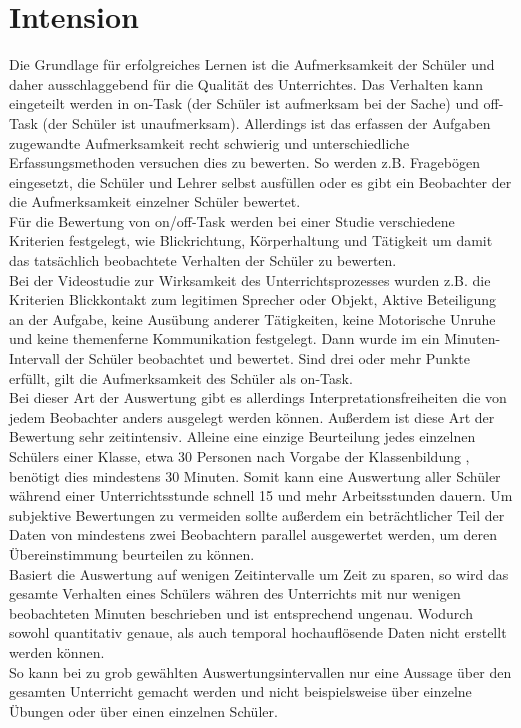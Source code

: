 \section{Intension}
\label{intension}
Die Grundlage für erfolgreiches Lernen ist die Aufmerksamkeit der Schüler und  daher ausschlaggebend für die Qualität des Unterrichtes. Das Verhalten kann eingeteilt werden in on-Task (der Schüler ist aufmerksam bei der Sache) und off-Task (der Schüler ist unaufmerksam). Allerdings ist das erfassen der Aufgaben zugewandte Aufmerksamkeit recht schwierig und unterschiedliche Erfassungsmethoden versuchen dies zu bewerten. So werden z.B. Fragebögen eingesetzt, die Schüler und Lehrer selbst ausfüllen oder es gibt ein Beobachter der die Aufmerksamkeit einzelner Schüler bewertet.\\
Für die Bewertung von on/off-Task werden bei einer Studie verschiedene Kriterien festgelegt, wie Blickrichtung, Körperhaltung und Tätigkeit um damit das tatsächlich beobachtete Verhalten der Schüler zu bewerten.\\
Bei der \glqq Videostudie zur Wirksamkeit des Unterrichtsprozesses \grqq \cite{aufmerksamkeit_Studie} wurden z.B. die Kriterien Blickkontakt zum legitimen Sprecher oder Objekt, Aktive Beteiligung an der Aufgabe, keine Ausübung anderer Tätigkeiten, keine Motorische Unruhe und keine themenferne Kommunikation festgelegt. Dann wurde im ein Minuten-Intervall der Schüler beobachtet und bewertet. Sind drei oder mehr Punkte erfüllt, gilt die Aufmerksamkeit des Schüler als on-Task.\\
Bei dieser Art der Auswertung gibt es allerdings Interpretationsfreiheiten die von jedem Beobachter anders ausgelegt werden können. Außerdem ist diese Art der Bewertung sehr zeitintensiv. Alleine eine einzige Beurteilung jedes einzelnen Schülers einer Klasse, etwa 30 Personen nach Vorgabe der Klassenbildung \cite{klassenteiler}, benötigt dies mindestens 30 Minuten. Somit kann eine Auswertung aller Schüler während einer Unterrichtsstunde schnell 15 und mehr Arbeitsstunden dauern. Um subjektive Bewertungen zu vermeiden sollte außerdem ein beträchtlicher Teil der Daten von mindestens zwei Beobachtern parallel ausgewertet werden, um deren Übereinstimmung beurteilen zu können.\\
Basiert die Auswertung auf wenigen Zeitintervalle um Zeit zu sparen, so wird das gesamte Verhalten eines Schülers währen des Unterrichts mit nur wenigen beobachteten Minuten beschrieben und ist entsprechend ungenau. Wodurch sowohl quantitativ genaue, als auch temporal hochauflösende Daten nicht erstellt werden können.\\
So kann bei zu grob gewählten Auswertungsintervallen nur eine Aussage über den gesamten Unterricht gemacht werden und nicht beispielsweise über einzelne Übungen oder über einen einzelnen Schüler.\\
\cite{aufmerksamkeit_Studie}